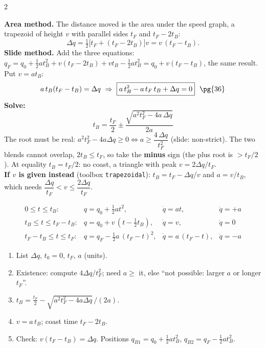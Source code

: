 \begin{multicols}{2}
\begin{fbx}[Slide equations \pg{33--34}, $t_0=0$]
\end{fbx}
\begin{deriv}
\textbf{Area method.} The distance moved is the area under the speed graph, a trapezoid of height $v$ with parallel sides $t_F$ and $t_F-2t_B$:
\[\Delta q=\tfrac12\big[t_F+(t_F-2t_B)\big]v=v\,(t_F-t_B).\]
\textbf{Slide method.} Add the three equations: $q_F=q_0+\tfrac12at_B^2+v(t_F-2t_B)+vt_B-\tfrac12at_B^2=q_0+v(t_F-t_B)$, the same result. Put $v=at_B$:
\[a\,t_B(t_F-t_B)=\Delta q\ \Rightarrow\ \boxed{a\,t_B^2-a\,t_F\,t_B+\Delta q=0}\ \ \pg{36}\]
\textbf{Solve:}
\[t_B=\frac{t_F}2\pm\frac{\sqrt{a^2t_F^2-4a\,\Delta q}}{2a}\]
The root must be real: $a^2t_F^2-4a\Delta q\ge0\iff\boxed{a\ge\dfrac{4\,\Delta q}{t_F^2}}$ (slide: non-strict). The two blends cannot overlap, $2t_B\le t_F$, so take the \textbf{minus} sign (the plus root is $>t_F/2$). At equality $t_B=t_F/2$: no coast, a triangle with peak $v=2\Delta q/t_F$.\\
\textbf{If $v$ is given instead} (toolbox \texttt{trapezoidal}): $t_B=t_F-\Delta q/v$ and $a=v/t_B$, which needs $\dfrac{\Delta q}{t_F}<v\le\dfrac{2\Delta q}{t_F}$. \chk
\end{deriv}
\begin{fbx}[The three segments as functions of time, $t_0=0$ \added]
\[\begin{array}{llll}
0\le t\le t_B: & q=q_0+\tfrac12at^2, & \dot q=at, & \ddot q=+a\\[1mm]
t_B\le t\le t_F-t_B: & q=q_0+v\,(t-\tfrac12t_B), & \dot q=v, & \ddot q=0\\[1mm]
t_F-t_B\le t\le t_F: & q=q_F-\tfrac12a\,(t_F-t)^2, & \dot q=a\,(t_F-t), & \ddot q=-a
\end{array}\]
\end{fbx}
\begin{recipe}
\begin{enumerate}
\item List $\Delta q$, $t_0=0$, $t_F$, $a$ (units).
\item Existence: compute $4\Delta q/t_F^2$; need $a\ge$ it, else ``not possible: larger $a$ or longer $t_F$''.
\item $t_B=\tfrac{t_F}2-\sqrt{a^2t_F^2-4a\Delta q}\,/(2a)$.
\item $v=a\,t_B$; coast time $t_F-2t_B$.
\item Check: $v(t_F-t_B)=\Delta q$. Positions $q_{B1}=q_0+\tfrac12at_B^2$, $q_{B2}=q_F-\tfrac12at_B^2$.

\end{enumerate}
\end{recipe}
\end{multicols}
